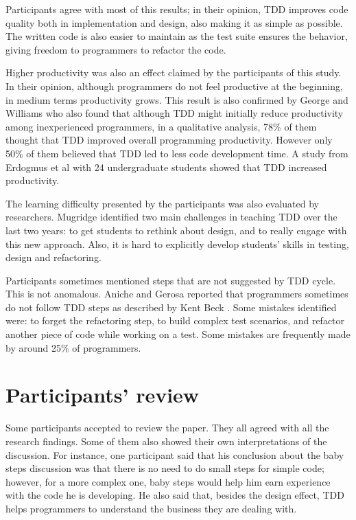 Participants agree with most of this results; in their opinion, TDD improves
code quality both in implementation and design, also making it as simple as possible.
The written code is also easier to maintain as the test suite ensures the
behavior, giving freedom to programmers to refactor the code.
 
Higher productivity was also an effect claimed by the participants of this
study. In their opinion, although programmers do not feel productive at the
beginning, in medium terms productivity grows. 
This result is also confirmed by George and
Williams who also found that although TDD might initially reduce productivity
among inexperienced programmers, in a qualitative analysis, 78\% of them thought that 
TDD improved overall programming productivity. However only 50\% of them 
believed that TDD led to less code development time.
A study from Erdogmus et al \cite{erdogmus} with 24 undergraduate students
showed that TDD increased productivity. 

The learning difficulty presented by the participants was also evaluated by
researchers. Mugridge \cite{mugridge} identified two main challenges in
teaching TDD over the last two years: to get students to rethink about design, 
and to really engage with this new approach. Also, it is
hard to explicitly develop students' skills in testing, design and refactoring.

Participants sometimes mentioned steps that are not suggested by TDD cycle. This
is not anomalous. Aniche and Gerosa \cite{aniche-gerosa} reported that
programmers sometimes do not follow TDD steps as described by Kent Beck \cite{tdd-by-example}.
Some mistakes identified were: to forget the refactoring step, to build complex
test scenarios, and refactor another piece of code while working on a test.
Some mistakes are frequently made by around 25\% of programmers.

\section{Participants' review}
\label{sec:review}

Some participants accepted to review the paper. They all agreed with all
the research findings. 
Some of them also showed their own interpretations of the discussion. For
instance, one participant said that his conclusion about the baby steps discussion was
that there is no need to do small steps for simple code; however, for a more
complex one, baby steps would help him earn experience with the code he is
developing. He also said that, besides the design effect, TDD helps programmers
to understand the business they are dealing with.


